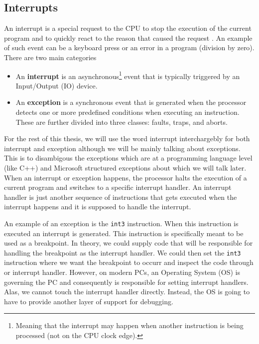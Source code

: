 \subsection{Interrupts}
An interrupt is a special request to the CPU to stop the execution of the
current program and to quickly react to the reason that caused the request
\cite{aps-interrupts}. An example of such event can be a keyboard press or
an error in a program (division by zero). There are two main categories
\cite{intel-manual}
\begin{itemize}
    \item An \textbf{interrupt} is an asynchronous\footnote{Meaning that the
        interrupt may happen when another instruction is being processed (not
        on the CPU clock edge).} event that is typically triggered by an
        Input/Output (IO) device.
    \item An \textbf{exception} is a synchronous event that is
        generated when the processor detects one or more predefined conditions
        when executing an instruction. These are further divided into three
        classes: faults, traps, and aborts.
\end{itemize}

For the rest of this thesis, we will use the word interrupt interchargebly for
both interrupt and exception although we will be mainly talking about
exceptions. This is to disambigous the exceptions which are at a programming
language level (like C++) and Microsoft structured exceptions about which we
will talk later. When an interrupt or exception happens, the processor halts
the execution of a current program and switches to a specific interrupt
handler. An interrupt handler is just another sequence of instructions that
gets executed when the interrupt happens and it is supposed to handle the
interrupt.

An example of an exception is the \texttt{int3} instruction. When this
instruction is executed an interrupt is generated. This instruction is
specifically meant to be used as a breakpoint. In theory, we could supply code
that will be responsible for handling the breakpoint as the interrupt handler.
We could then set the \texttt{int3} instruction where we want the breakpoint to
occurr and inspect the code through or interrupt handler. However, on modern
PCs, an Operating System (OS) is governing the PC and consequently is
responsible for setting interrupt handlers. Alas, we cannot touch the interrupt
handler directly. Instead, the OS is going to have to provide another layer of
support for debugging.

